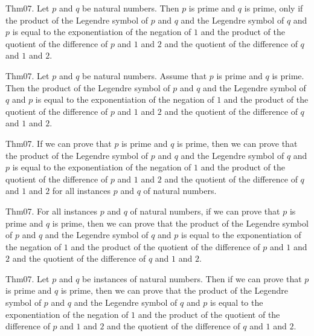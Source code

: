 \documentclass{article}
\begin{document}
Thm07. Let $p$ and $q$ be natural numbers. Then $p$ is prime and $q$ is prime, only if the product of the Legendre symbol of $p$ and $q$ and the Legendre symbol of $q$ and $p$ is equal to the exponentiation of the negation of $1$ and the product of the quotient of the difference of $p$ and $1$ and $2$ and the quotient of the difference of $q$ and $1$ and $2$.

Thm07. Let $p$ and $q$ be natural numbers. Assume that $p$ is prime and $q$ is prime. Then the product of the Legendre symbol of $p$ and $q$ and the Legendre symbol of $q$ and $p$ is equal to the exponentiation of the negation of $1$ and the product of the quotient of the difference of $p$ and $1$ and $2$ and the quotient of the difference of $q$ and $1$ and $2$.

Thm07. If we can prove that $p$ is prime and $q$ is prime, then we can prove that the product of the Legendre symbol of $p$ and $q$ and the Legendre symbol of $q$ and $p$ is equal to the exponentiation of the negation of $1$ and the product of the quotient of the difference of $p$ and $1$ and $2$ and the quotient of the difference of $q$ and $1$ and $2$ for all instances $p$ and $q$ of natural numbers.

Thm07. For all instances $p$ and $q$ of natural numbers, if we can prove that $p$ is prime and $q$ is prime, then we can prove that the product of the Legendre symbol of $p$ and $q$ and the Legendre symbol of $q$ and $p$ is equal to the exponentiation of the negation of $1$ and the product of the quotient of the difference of $p$ and $1$ and $2$ and the quotient of the difference of $q$ and $1$ and $2$.

Thm07. Let $p$ and $q$ be instances of natural numbers. Then if we can prove that $p$ is prime and $q$ is prime, then we can prove that the product of the Legendre symbol of $p$ and $q$ and the Legendre symbol of $q$ and $p$ is equal to the exponentiation of the negation of $1$ and the product of the quotient of the difference of $p$ and $1$ and $2$ and the quotient of the difference of $q$ and $1$ and $2$.
\end{document}
